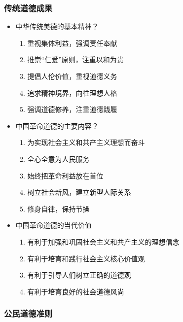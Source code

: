 \hypertarget{ux4f20ux7edfux9053ux5fb7ux6210ux679c}{%
\subsubsection{传统道德成果}\label{ux4f20ux7edfux9053ux5fb7ux6210ux679c}}

\begin{itemize}
\tightlist
\item
  中华传统美德的基本精神？

  \begin{enumerate}
  \def\labelenumi{\arabic{enumi}.}
  \tightlist
  \item
    重视集体利益，强调责任奉献
  \item
    推崇``仁爱''原则，注重以和为贵
  \item
    提倡人伦价值，重视道德义务
  \item
    追求精神境界，向往理想人格
  \item
    强调道德修养，注重道德践履
  \end{enumerate}
\item
  中国革命道德的主要内容？

  \begin{enumerate}
  \def\labelenumi{\arabic{enumi}.}
  \tightlist
  \item
    为实现社会主义和共产主义理想而奋斗
  \item
    全心全意为人民服务
  \item
    始终把革命利益放在首位
  \item
    树立社会新风，建立新型人际关系
  \item
    修身自律，保持节操
  \end{enumerate}
\item
  中国革命道德的当代价值

  \begin{enumerate}
  \def\labelenumi{\arabic{enumi}.}
  \tightlist
  \item
    有利于加强和巩固社会主义和共产主义的理想信念
  \item
    有利于培育和践行社会主义核心价值观
  \item
    有利于引导人们树立正确的道德观
  \item
    有利于培育良好的社会道德风尚
  \end{enumerate}
\end{itemize}

\hypertarget{ux516cux6c11ux9053ux5fb7ux51c6ux5219}{%
\subsubsection{公民道德准则}\label{ux516cux6c11ux9053ux5fb7ux51c6ux5219}}

